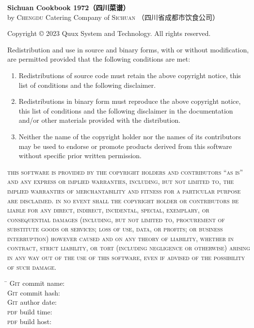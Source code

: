 \begingroup%
\footnotesize%
\singlespacing%
\setlength{\parindent}{0pt}%
\setlength{\parskip}{.166666\baselineskip}%
{\sffamily\bfseries Sichuan Cookbook 1972\!（四川菜谱）}\\
by \textsc{Chengdu} Catering Company of \textsc{Sichuan}\!%
（四川省成都市饮食公司）

\null

Copyright {\copyright} 2023 Quux System and Technology. All rights reserved.

Redistribution and use in source and binary forms, with or without
modification, are permitted provided that the following conditions are met:

\begin{enumerate}
\item Redistributions of source code must retain the above copyright notice,
      this list of conditions and the following disclaimer.

\item Redistributions in binary form must reproduce the above copyright notice,
      this list of conditions and the following disclaimer in the documentation
      and/or other materials provided with the distribution.

\item Neither the name of the copyright holder nor the names of its
      contributors may be used to endorse or promote products derived from
      this software without specific prior written permission.
\end{enumerate}

\textsc{this software is provided by the copyright holders and contributors
``as is'' and any express or implied warranties, including, but not limited to,
the implied warranties of merchantability and fitness for a particular purpose
are disclaimed. in no event shall the copyright holder or contributors be
liable for any direct, indirect, incidental, special, exemplary, or
consequential damages (including, but not limited to, procurement of
substitute goods or services; loss of use, data, or profits; or business
interruption) however caused and on any theory of liability, whether in
contract, strict liability, or tort (including negligence or otherwise)
arising in any way out of the use of this software, even if advised of the
possibility of such damage.}

\vfill

\setlength{\parskip}{.333333\baselineskip}%
\begin{tabbing}
\hspace{8.75em}\= \kill
\textsc{Git} commit name: \>\texttt{\gitcommitname}\\
\textsc{Git} commit hash: \>\texttt{\gitcommithash}\\
\textsc{Git} author date: \>\texttt{\gitauthordate}\\
\textsc{pdf} build time:  \>\texttt{\pdfbuildtime}\\
\textsc{pdf} build host:  \>\texttt{\pdfbuildhost}
\end{tabbing}
\vspace{-1\baselineskip}

